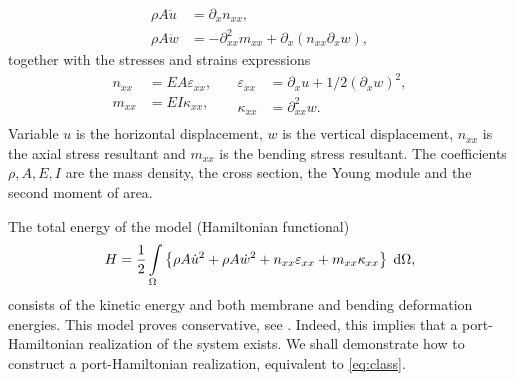 \documentclass{ifacconf}
\begin{document}
\begin{equation}\label{eq:class}
	\begin{aligned}
		\rho A \ddot{u} &= \partial_x n_{xx}, \\
		\rho A \ddot{w} &= -\partial^2_{xx} m_{xx} + \partial_x(n_{xx} \partial_x w),
	\end{aligned} 
\end{equation}
together with the stresses and strains expressions
\begin{equation}
	\begin{aligned}
		n_{xx} &= EA \varepsilon_{xx}, \\
		m_{xx} &= EI \kappa_{xx}, \\
	\end{aligned} \quad
	\begin{aligned}
		\varepsilon_{xx} &= \partial_x u + 1/2 (\partial_x w)^2, \\
		\kappa_{xx} &=\partial^2_{xx} w. \\
	\end{aligned} 
\end{equation}
Variable $u$ is the horizontal displacement, $w$ is the vertical displacement, $n_{xx}$ is the axial stress resultant and $m_{xx}$ is the bending stress resultant. The coefficients $\rho, A, E, I$ are the mass density, the cross section, the Young module and the second moment of area.

The total energy of the model (Hamiltonian functional)
\begin{equation}
	H = \frac{1}{2} \int_{\Omega}\left\{\rho A \dot{u}^2 + \rho A \dot{w}^2 + n_{xx} \varepsilon_{xx} + m_{xx} \kappa_{xx} \right\} \d\Omega,
\end{equation}
consists of the kinetic energy and both membrane and bending deformation energies.
This model proves conservative, see \cite{bilbao2015conservative}. Indeed, this implies that a port-Hamiltonian realization of the system exists. We shall demonstrate how to construct a port-Hamiltonian realization, equivalent to \eqref{eq:class}.
\end{document}
